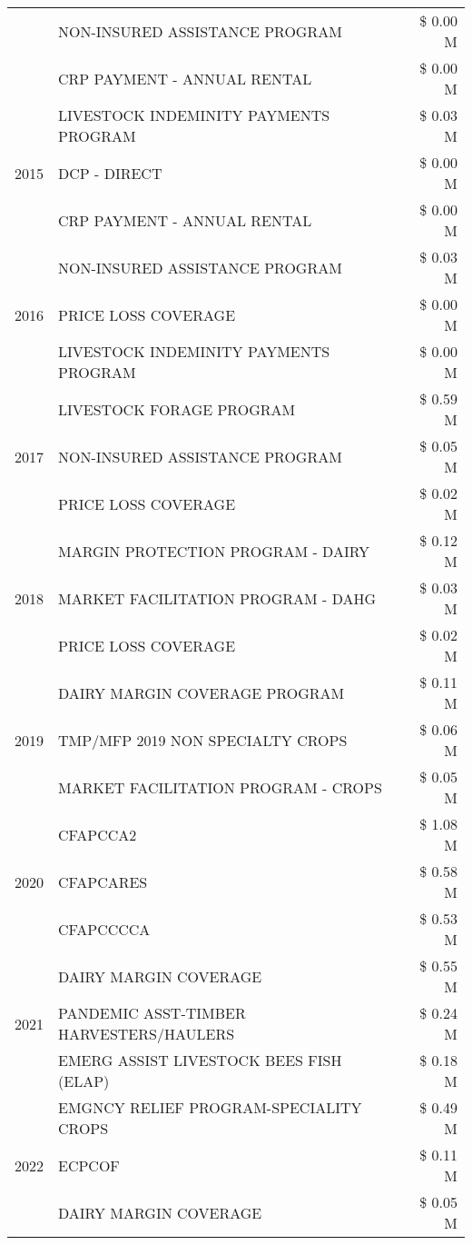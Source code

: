 \begin{tabular}{llr}
 & NON-INSURED ASSISTANCE PROGRAM & \$ 0.00 M \\
 & CRP PAYMENT - ANNUAL RENTAL & \$ 0.00 M \\
\cline{1-3}
\multirow[t]{3}{*}{2015} & LIVESTOCK INDEMINITY PAYMENTS PROGRAM & \$ 0.03 M \\
 & DCP - DIRECT & \$ 0.00 M \\
 & CRP PAYMENT - ANNUAL RENTAL & \$ 0.00 M \\
\cline{1-3}
\multirow[t]{3}{*}{2016} & NON-INSURED ASSISTANCE PROGRAM & \$ 0.03 M \\
 & PRICE LOSS COVERAGE & \$ 0.00 M \\
 & LIVESTOCK INDEMINITY PAYMENTS PROGRAM & \$ 0.00 M \\
\cline{1-3}
\multirow[t]{3}{*}{2017} & LIVESTOCK FORAGE PROGRAM & \$ 0.59 M \\
 & NON-INSURED ASSISTANCE PROGRAM & \$ 0.05 M \\
 & PRICE LOSS COVERAGE & \$ 0.02 M \\
\cline{1-3}
\multirow[t]{3}{*}{2018} & MARGIN PROTECTION PROGRAM - DAIRY & \$ 0.12 M \\
 & MARKET FACILITATION PROGRAM - DAHG & \$ 0.03 M \\
 & PRICE LOSS COVERAGE & \$ 0.02 M \\
\cline{1-3}
\multirow[t]{3}{*}{2019} & DAIRY MARGIN COVERAGE PROGRAM & \$ 0.11 M \\
 & TMP/MFP 2019 NON SPECIALTY CROPS & \$ 0.06 M \\
 & MARKET FACILITATION PROGRAM - CROPS & \$ 0.05 M \\
\cline{1-3}
\multirow[t]{3}{*}{2020} & CFAPCCA2 & \$ 1.08 M \\
 & CFAPCARES & \$ 0.58 M \\
 & CFAPCCCCA & \$ 0.53 M \\
\cline{1-3}
\multirow[t]{3}{*}{2021} & DAIRY MARGIN COVERAGE & \$ 0.55 M \\
 & PANDEMIC ASST-TIMBER HARVESTERS/HAULERS & \$ 0.24 M \\
 & EMERG ASSIST LIVESTOCK BEES FISH (ELAP) & \$ 0.18 M \\
\cline{1-3}
\multirow[t]{3}{*}{2022} & EMGNCY RELIEF PROGRAM-SPECIALITY CROPS & \$ 0.49 M \\
 & ECPCOF & \$ 0.11 M \\
 & DAIRY MARGIN COVERAGE & \$ 0.05 M \\
\cline{1-3}
\bottomrule
\end{tabular}
